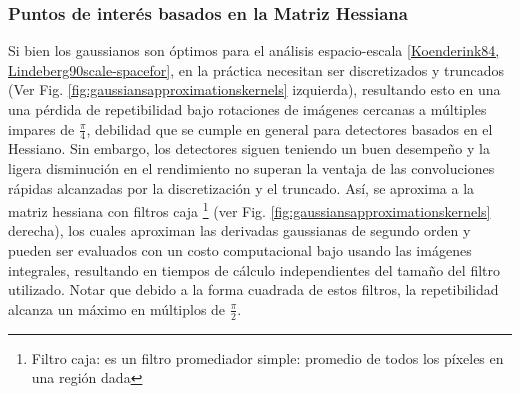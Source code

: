 \subsubsection{Puntos de interés basados en la Matriz Hessiana}
% 

Si bien los gaussianos son óptimos para el análisis espacio-escala \ref{Koenderink84, Lindeberg90scale-spacefor}, en la práctica necesitan ser discretizados y truncados (Ver Fig. \ref{fig:gaussiansapproximationskernels} izquierda), resultando esto en una una pérdida de repetibilidad bajo rotaciones de imágenes cercanas a múltiples impares de $\frac{\pi}{4}$, debilidad que se cumple en general para detectores basados en el Hessiano. Sin embargo, los detectores siguen teniendo un buen desempeño y la ligera disminución en el rendimiento no superan la ventaja de las convoluciones rápidas alcanzadas por la discretización y el truncado. %
Así, se aproxima a la matriz hessiana con filtros caja \footnote{Filtro caja: es un filtro promediador simple: promedio de todos los píxeles en una región dada} (ver Fig. \ref{fig:gaussiansapproximationskernels} derecha), los cuales aproximan las derivadas gaussianas de segundo orden y pueden ser evaluados con un costo computacional bajo usando las imágenes integrales, resultando en tiempos de cálculo independientes del tamaño del filtro utilizado.
Notar que debido a la forma cuadrada de estos filtros, la repetibilidad alcanza un máximo en múltiplos de $\frac{\pi}{2}$.

